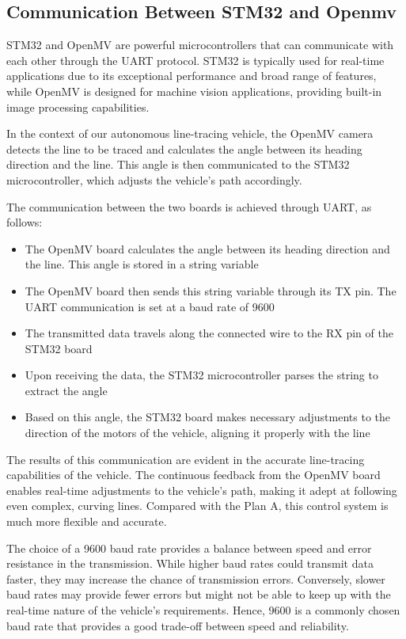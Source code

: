 \documentclass[12pt, a4paper, oneside]{report}
\begin{document}
\subsection{Communication Between STM32 and Openmv}
STM32 and OpenMV are powerful microcontrollers that can communicate with each other through the UART protocol. STM32 is typically used for real-time applications due to its exceptional performance and broad range of features, while OpenMV is designed for machine vision applications, providing built-in image processing capabilities.

In the context of our autonomous line-tracing vehicle, the OpenMV camera detects the line to be traced and calculates the angle between its heading direction and the line. This angle is then communicated to the STM32 microcontroller, which adjusts the vehicle's path accordingly.

The communication between the two boards is achieved through UART, as follows:
\begin{itemize}
    \item The OpenMV board calculates the angle between its heading direction and the line. This angle is stored in a string variable
    \item The OpenMV board then sends this string variable through its TX pin. The UART communication is set at a baud rate of 9600
    \item The transmitted data travels along the connected wire to the RX pin of the STM32 board
    \item Upon receiving the data, the STM32 microcontroller parses the string to extract the angle
    \item Based on this angle, the STM32 board makes necessary adjustments to the direction of the motors of the vehicle, aligning it properly with the line
\end{itemize}

The results of this communication are evident in the accurate line-tracing capabilities of the vehicle. The continuous feedback from the OpenMV board enables real-time adjustments to the vehicle's path, making it adept at following even complex, curving lines. Compared with the Plan A, this control system is much more flexible and accurate.

The choice of a 9600 baud rate provides a balance between speed and error resistance in the transmission. While higher baud rates could transmit data faster, they may increase the chance of transmission errors. Conversely, slower baud rates may provide fewer errors but might not be able to keep up with the real-time nature of the vehicle's requirements. Hence, 9600 is a commonly chosen baud rate that provides a good trade-off between speed and reliability.
\end{document}
